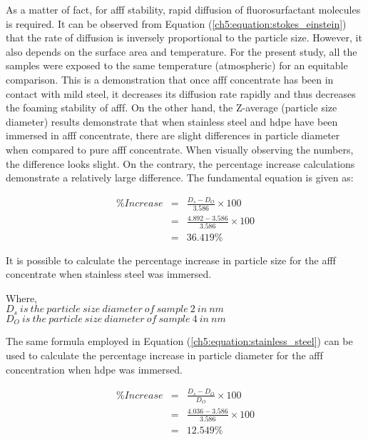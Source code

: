 As a matter of fact, for \acrshort{afff} stability, rapid diffusion of fluorosurfactant molecules is required. It can be observed from Equation (\ref{ch5:equation:stokes_einstein}) that the rate of diffusion is inversely proportional to the particle size. However, it also depends on the surface area and temperature. For the present study, all the samples were exposed to the same temperature (atmospheric) for an equitable comparison. This is a demonstration that once \acrshort{afff} concentrate has been in contact with mild steel, it decreases its diffusion rate rapidly and thus decreases the foaming stability of \acrshort{afff}.  On the other hand, the Z-average (particle size diameter) results demonstrate that when stainless steel and \acrshort{hdpe} have been immersed in \acrshort{afff} concentrate, there are slight differences in particle diameter when compared to pure \acrshort{afff} concentrate. When visually observing the numbers, the difference looks slight. On the contrary, the percentage increase calculations demonstrate a relatively large difference. The fundamental equation is given as:

\begin{doublespace}
\begin{eqnarray}
    \label{ch5:equation:stainless_steel}
    \%Increase &=& \frac{D_s - D_O}{3.586} \times 100 \\ 
    \nonumber &=& \frac{4.892 - 3.586}{3.586}\times 100 \\
    \nonumber &=& 36.419\%
\end{eqnarray}
\end{doublespace}

It is possible to calculate the percentage increase in particle size for the \acrshort{afff} concentrate when stainless steel was immersed.

\begin{doublespace}
Where, \\
$D_s\ is\ the\ particle\ size\ diameter\ of\ sample\ 2\ in\ nm$ \\
$D_O\ is\ the\ particle\ size\ diameter\ of\ sample\ 4\ in\ nm$ \\
\end{doublespace}

The same formula employed in Equation (\ref{ch5:equation:stainless_steel}) can be used to calculate the percentage increase in particle diameter for the \acrshort{afff} concentration when \acrshort{hdpe} was immersed. 

\begin{doublespace}
\begin{eqnarray}
    \label{ch5:equation:hdpe}
    \%Increase &=& \frac{D_s - D_O}{D_O} \times 100 \\ 
    \nonumber &=& \frac{4.036 - 3.586}{3.586}\times 100 \\
    \nonumber &=& 12.549\% 
\end{eqnarray}
\end{doublespace}
 
